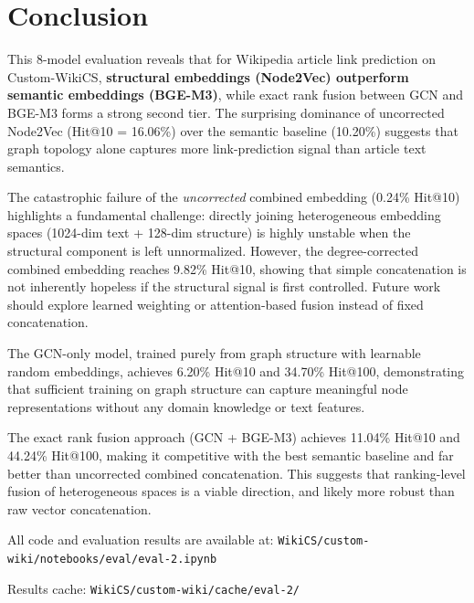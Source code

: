 \documentclass[12pt,a4paper]{article}
\begin{document}
\section{Conclusion}

This 8-model evaluation reveals that for Wikipedia article link prediction on
Custom-WikiCS, \textbf{structural embeddings (Node2Vec) outperform semantic
embeddings (BGE-M3)}, while exact rank fusion between GCN and BGE-M3 forms a
strong second tier.  The surprising dominance of uncorrected Node2Vec
(Hit@10 = 16.06\%) over the semantic baseline (10.20\%) suggests that graph
topology alone captures more link-prediction signal than article text semantics.

The catastrophic failure of the \emph{uncorrected} combined embedding
(0.24\% Hit@10) highlights a fundamental challenge: directly joining
heterogeneous embedding spaces (1024-dim text + 128-dim structure) is highly
unstable when the structural component is left unnormalized.  However, the
degree-corrected combined embedding reaches 9.82\% Hit@10, showing that simple
concatenation is not inherently hopeless if the structural signal is first
controlled.  Future work should explore learned weighting or attention-based
fusion instead of fixed concatenation.

The GCN-only model, trained purely from graph structure with learnable random
embeddings, achieves 6.20\% Hit@10 and 34.70\% Hit@100, demonstrating that
sufficient training on graph structure can capture meaningful node representations
without any domain knowledge or text features.

The exact rank fusion approach (GCN + BGE-M3) achieves 11.04\% Hit@10 and
44.24\% Hit@100, making it competitive with the best semantic baseline and far
better than uncorrected combined concatenation.  This suggests that ranking-level
fusion of heterogeneous spaces is a viable direction, and likely more robust than
raw vector concatenation.

All code and evaluation results are available at:
\texttt{WikiCS/custom-wiki/notebooks/eval/eval-2.ipynb}

Results cache:
\texttt{WikiCS/custom-wiki/cache/eval-2/}
\end{document}
